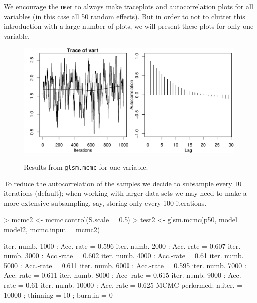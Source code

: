 \documentclass[12pt,a4paper]{article}
\begin{document}
We encourage the user to always make traceplots and autocorrelation
plots for all variables (in this case all 50 random effects). But in
order to not to clutter this introduction with a large number of
plots, we will present these plots for only one variable.

\newpage

\begin{figure}[h!]
\centering
\begin{Schunk}
\end{Schunk}
\includegraphics{geoRglmintro-013}
\label{fig:pois.krige}
\caption{Results from \texttt{glsm.mcmc} for one variable.}
\end{figure}

To reduce the autocorrelation of the samples we decide to subsample every 10 iterations (default); when working with larger data sets we may need to make a more 
extensive subsampling, say, storing only every 100 iterations.

\begin{Schunk}
\begin{Sinput}
> mcmc2 <- mcmc.control(S.scale = 0.5)
> test2 <- glsm.mcmc(p50, model = model2, mcmc.input = mcmc2)
\end{Sinput}
\begin{Soutput}
iter. numb. 1000  : Acc.-rate =  0.596 
iter. numb. 2000  : Acc.-rate =  0.607 
iter. numb. 3000  : Acc.-rate =  0.602 
iter. numb. 4000  : Acc.-rate =  0.61 
iter. numb. 5000  : Acc.-rate =  0.611 
iter. numb. 6000  : Acc.-rate =  0.595 
iter. numb. 7000  : Acc.-rate =  0.611 
iter. numb. 8000  : Acc.-rate =  0.615 
iter. numb. 9000  : Acc.-rate =  0.61 
iter. numb. 10000  : Acc.-rate =  0.625 
MCMC performed: n.iter. =  10000 ; thinning =  10 ; burn.in =  0 
\end{Soutput}
\end{Schunk}
\end{document}
